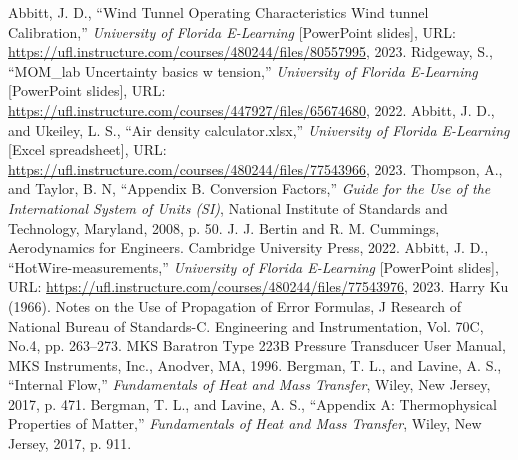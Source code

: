 \documentclass[journal,letterpaper]{IEEEtran}
\begin{document}
\begin{thebibliography}{99}
     Abbitt, J. D., ``Wind Tunnel Operating Characteristics
    Wind tunnel Calibration,'' \textit{University of Florida E-Learning} [PowerPoint slides], URL: \url{https://ufl.instructure.com/courses/480244/files/80557995}, 2023.
     Ridgeway, S., ``MOM\_lab Uncertainty basics w tension,'' \textit{University of Florida E-Learning} [PowerPoint slides], URL: \url{https://ufl.instructure.com/courses/447927/files/65674680}, 2022.
     Abbitt, J. D., and Ukeiley, L. S., ``Air density calculator.xlsx,'' \textit{University of Florida E-Learning} [Excel spreadsheet], URL: \url{https://ufl.instructure.com/courses/480244/files/77543966}, 2023.
     Thompson, A., and Taylor, B. N, ``Appendix B. Conversion Factors,'' \textit{Guide for the Use of the International System of Units (SI)}, National Institute of Standards and Technology, Maryland, 2008, p. 50.
     J. J. Bertin and R. M. Cummings, Aerodynamics for Engineers. Cambridge University Press, 2022.
     Abbitt, J. D., ``HotWire-measurements,'' \textit{University of Florida E-Learning} [PowerPoint slides], URL: \url{https://ufl.instructure.com/courses/480244/files/77543976}, 2023.
     Harry Ku (1966). Notes on the Use of Propagation of Error Formulas, J Research of National Bureau of Standards-C. Engineering and Instrumentation, Vol. 70C, No.4, pp. 263--273.
     MKS Baratron Type 223B Pressure Transducer User Manual, MKS Instruments, Inc., Anodver, MA, 1996.
     Bergman, T. L., and Lavine, A. S., ``Internal Flow,'' \textit{Fundamentals of Heat and Mass Transfer}, Wiley, New Jersey, 2017, p. 471.
     Bergman, T. L., and Lavine, A. S., ``Appendix A: Thermophysical Properties of Matter,'' \textit{Fundamentals of Heat and Mass Transfer}, Wiley, New Jersey, 2017, p. 911.
\end{thebibliography}
\end{document}
